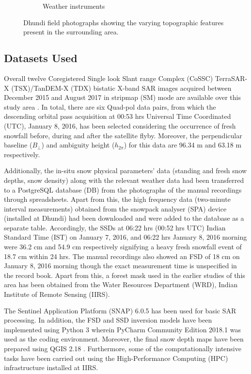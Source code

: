 \documentclass[review]{elsarticle}
\numberwithin{equation}{section}
\numberwithin{figure}{section}
\numberwithin{table}{section}
\begin{document}
\begin{figure}[!t]
\begin{subfigure}[t]{0.49\textwidth}
        \caption{Weather instruments}
        \label{subfig:stations}
    \end{subfigure}
    \caption{Dhundi field photographs showing the varying topographic features present in the surrounding area.}
    \label{fig:field}
\end{figure}

\subsection{Datasets Used}
\label{ssec:data}
Overall twelve Coregistered Single look Slant range Complex (CoSSC) TerraSAR-X (TSX)/TanDEM-X (TDX) bistatic X-band SAR images acquired between December 2015 and August 2017 in stripmap (SM) mode are available over this study area \citep{Balss2012}. In total, there are six Quad-pol data pairs, from which the descending orbital pass acquisition at 00:53 hrs Universal Time Coordinated (UTC), January 8, 2016, has been selected considering the occurrence of fresh snowfall before, during and after the satellite flyby. Moreover, the perpendicular baseline ($B_\bot$) and ambiguity height ($h_{2\pi}$) for this data are 96.34 m and 63.18 m respectively. 

Additionally, the in-situ snow physical parameters’ data (standing and fresh snow depths, snow density) along with the relevant weather data had been transferred to a PostgreSQL database (DB) \citep{PostgreSQL2019} from the photographs of the manual recordings through spreadsheets. Apart from this, the high frequency data (two-minute interval measurements) obtained from the snowpack analyser (SPA) device (installed at Dhundi) had been downloaded and were added to the database as a separate table. Accordingly, the SSDs at 06:22 hrs (00:52 hrs UTC) Indian Standard Time (IST) on January 7, 2016, and 06:22 hrs January 8, 2016 morning were 36.2 cm and 54.9 cm respectively signifying a heavy fresh snowfall event of 18.7 cm within 24 hrs. The manual recordings also showed an FSD of 18 cm on January 8, 2016 morning though the exact measurement time is unspecified in the record book. Apart from this, a forest mask used in the earlier studies of this area \citep{Thakur2012, Thakur2017} has been obtained from the Water Resources Department (WRD), Indian Institute of Remote Sensing (IIRS).

The Sentinel Application Platform (SNAP) 6.0.5 \citep{ESA2018} has been used for basic SAR processing. In addition, the FSD and SSD inversion models have been implemented using Python 3 wherein PyCharm Community Edition 2018.1 \citep{JetBrains2018} was used as the coding environment. Moreover, the final snow depth maps have been prepared using QGIS 2.18 \citep{QGIS2016}. Furthermore, some of the computationally intensive tasks have been carried out using the High-Performance Computing (HPC) infrastructure installed at IIRS.
\end{document}
